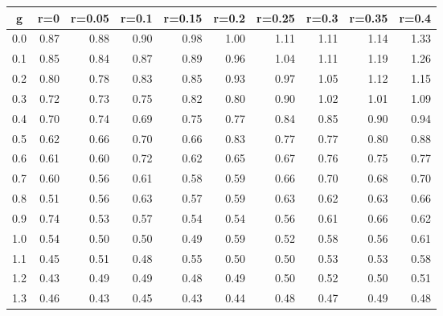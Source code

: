 %
\begin{table}[!tbp]
 \begin{center}
 \begin{tabular}{rrrrrrrrrr}\hline\hline
\multicolumn{1}{c}{g}&\multicolumn{1}{c}{r=0}&\multicolumn{1}{c}{r=0.05}&\multicolumn{1}{c}{r=0.1}&\multicolumn{1}{c}{r=0.15}&\multicolumn{1}{c}{r=0.2}&\multicolumn{1}{c}{r=0.25}&\multicolumn{1}{c}{r=0.3}&\multicolumn{1}{c}{r=0.35}&\multicolumn{1}{c}{r=0.4}\tabularnewline
\hline
0.0&0.87&0.88&0.90&0.98&1.00&1.11&1.11&1.14&1.33\tabularnewline
0.1&0.85&0.84&0.87&0.89&0.96&1.04&1.11&1.19&1.26\tabularnewline
0.2&0.80&0.78&0.83&0.85&0.93&0.97&1.05&1.12&1.15\tabularnewline
0.3&0.72&0.73&0.75&0.82&0.80&0.90&1.02&1.01&1.09\tabularnewline
0.4&0.70&0.74&0.69&0.75&0.77&0.84&0.85&0.90&0.94\tabularnewline
0.5&0.62&0.66&0.70&0.66&0.83&0.77&0.77&0.80&0.88\tabularnewline
0.6&0.61&0.60&0.72&0.62&0.65&0.67&0.76&0.75&0.77\tabularnewline
0.7&0.60&0.56&0.61&0.58&0.59&0.66&0.70&0.68&0.70\tabularnewline
0.8&0.51&0.56&0.63&0.57&0.59&0.63&0.62&0.63&0.66\tabularnewline
0.9&0.74&0.53&0.57&0.54&0.54&0.56&0.61&0.66&0.62\tabularnewline
1.0&0.54&0.50&0.50&0.49&0.59&0.52&0.58&0.56&0.61\tabularnewline
1.1&0.45&0.51&0.48&0.55&0.50&0.50&0.53&0.53&0.58\tabularnewline
1.2&0.43&0.49&0.49&0.48&0.49&0.50&0.52&0.50&0.51\tabularnewline
1.3&0.46&0.43&0.45&0.43&0.44&0.48&0.47&0.49&0.48\tabularnewline
\hline
\end{tabular}

\end{center}

\end{table}

